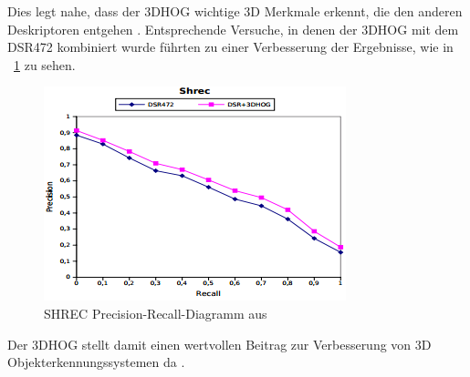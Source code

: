  Dies legt nahe, dass der 3DHOG wichtige 3D Merkmale erkennt, die den anderen Deskriptoren entgehen \cite{scherer2010histograms}.
\newline
Entsprechende Versuche, in denen der 3DHOG mit dem DSR472 kombiniert wurde führten zu einer Verbesserung der Ergebnisse, wie in \figurename~\ref{SHREC_TEAM_3DHOG_DSR472} zu sehen. 

\begin{figure}[thpb]
	\centering
	\includegraphics[width=\linewidth]{2-Hauptteil/pics/SHREC_TEAM_3DHOG_DSR472.png}
	\caption{SHREC Precision-Recall-Diagramm aus \cite{scherer2010histograms}}
	\label{SHREC_TEAM_3DHOG_DSR472}
\end{figure}

Der 3DHOG stellt damit einen wertvollen Beitrag zur Verbesserung von 3D Objekterkennungssystemen da \cite{scherer2010histograms}.
